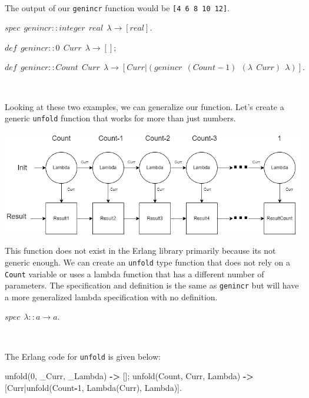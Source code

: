 \documentclass[
]{book}
\newenvironment{Shaded}{\begin{snugshade}}{\end{snugshade}}
\newcommand{\DecValTok}[1]{\textcolor[rgb]{0.00,0.00,0.81}{#1}}
\newcommand{\FunctionTok}[1]{\textcolor[rgb]{0.00,0.00,0.00}{#1}}
\newcommand{\OperatorTok}[1]{\textcolor[rgb]{0.81,0.36,0.00}{\textbf{#1}}}
\newcommand{\VariableTok}[1]{\textcolor[rgb]{0.00,0.00,0.00}{#1}}
\begin{document}
\(\nonumber\)

The output of our \texttt{genincr} function would be \texttt{{[}4\ 6\ 8\ 10\ 12{]}}.

\begin{formulabox}
\(spec ~ ~ genincr :: integer ~ ~ real ~ ~ \lambda \rightarrow [real].\)

\(de\mathit{f} ~ ~ genincr :: 0 ~ ~ Curr ~ ~ \lambda \rightarrow [];\)

\(de\mathit{f} ~ ~ genincr :: Count ~ ~ Curr ~ ~ \lambda \rightarrow [Curr | (genincr ~ ~ (Count-1) ~ ~ (\lambda ~ ~ Curr) ~ ~ \lambda)].\)

\end{formulabox}

\(\nonumber\)

Looking at these two examples, we can generalize our function. Let's create a generic \texttt{unfold} function that works for more than just numbers.

\includegraphics{images/unfold.drawio.png}

This function does not exist in the Erlang library primarily because its not generic enough. We can create an \texttt{unfold} type function that does not rely on a \texttt{Count} variable or uses a lambda function that has a different number of parameters. The specification and definition is the same as \texttt{genincr} but will have a more generalized lambda specification with no definition.

\begin{formulabox}
\(spec ~ ~ \lambda :: a \rightarrow a.\)

\end{formulabox}

\(\nonumber\)

The Erlang code for \texttt{unfold} is given below:

\begin{Shaded}
\begin{Highlighting}[]
\FunctionTok{unfold(}\DecValTok{0}\FunctionTok{,} \VariableTok{\_Curr}\FunctionTok{,} \VariableTok{\_Lambda}\FunctionTok{)} \OperatorTok{{-}\textgreater{}} \FunctionTok{[];}
\FunctionTok{unfold(}\VariableTok{Count}\FunctionTok{,} \VariableTok{Curr}\FunctionTok{,} \VariableTok{Lambda}\FunctionTok{)} \OperatorTok{{-}\textgreater{}} \FunctionTok{[}\VariableTok{Curr}\FunctionTok{|unfold(}\VariableTok{Count}\OperatorTok{{-}}\DecValTok{1}\FunctionTok{,} \VariableTok{Lambda}\FunctionTok{(}\VariableTok{Curr}\FunctionTok{),} \VariableTok{Lambda}\FunctionTok{)].}
\end{Highlighting}
\end{Shaded}
\end{document}
